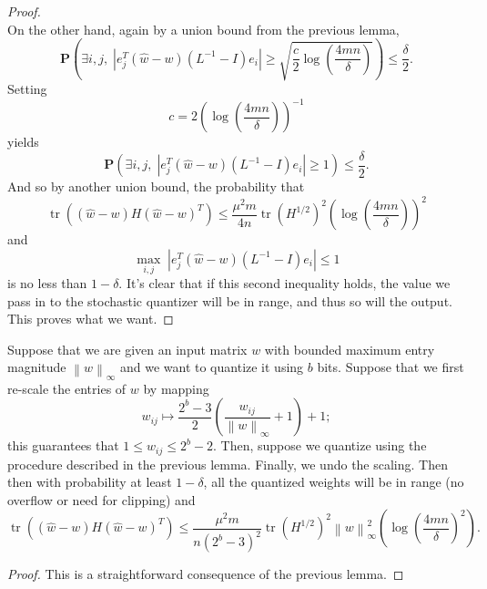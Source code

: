 \begin{toappendix}
\begin{proof}
\[\]
On the other hand, again by a union bound from the previous lemma,
\[
	\mathbf{P}\left( \exists i,j, \; \left| e_j^T (\hat w - w) (L^{-1} - I) e_i \right| \ge \sqrt{\frac{c}{2} \log\left( \frac{4 m n}{\delta} \right) } \right) \le \frac{\delta}{2}.
\]
Setting
\[
	c = 2 \left( \log\left( \frac{4 m n}{\delta} \right) \right)^{-1}
\]
yields
\[
	\mathbf{P}\left( \exists i,j, \; \left| e_j^T (\hat w - w) (L^{-1} - I) e_i \right| \ge 1 \right) \le \frac{\delta}{2}.
\]
And so by another union bound, the probability that
\[
	\operatorname{tr}\left( (\hat w - w) H (\hat w - w)^T \right) \le \frac{\mu^2 m}{4n} \operatorname{tr}\left(H^{1/2}\right)^2 \left( \log\left( \frac{4 mn}{\delta}\right) \right)^2
\]
and
\[
	\max_{i,j} \; \left| e_j^T (\hat w - w) (L^{-1} - I) e_i \right| \le 1
\]
is no less than $1 - \delta$. It's clear that if this second inequality holds, the value we pass in to the stochastic quantizer will be in range, and thus so will the output. This proves what we want.
\end{proof}

\begin{theorem}
Suppose that we are given an input matrix $w$ with bounded maximum entry magnitude $\left\|w\right\|_{\infty}$ and we want to quantize it using $b$ bits. Suppose that we first re-scale the entries of $w$ by mapping
\[
	w_{ij} \mapsto \frac{2^b - 3}{2} \left( \frac{w_{ij}}{\left\|w\right\|_{\infty}} + 1 \right) + 1;
\]
this guarantees that $1 \le w_{ij} \le 2^b - 2$. Then, suppose we quantize using the procedure described in the previous lemma. Finally, we undo the scaling. Then then with probability at least $1 - \delta$, all the quantized weights will be in range (no overflow or need for clipping) and
\[
	\operatorname{tr}\left( (\hat w - w) H (\hat w - w)^T \right) \le \frac{\mu^2 m}{n (2^b - 3)^2} \operatorname{tr}\left(H^{1/2}\right)^2 \left\|w\right\|_{\infty}^2 \left( \log\left( \frac{4 mn}{\delta}\right)^2 \right).
\]
\end{theorem}
\begin{proof}
This is a straightforward consequence of the previous lemma.
\end{proof}


\end{toappendix}
